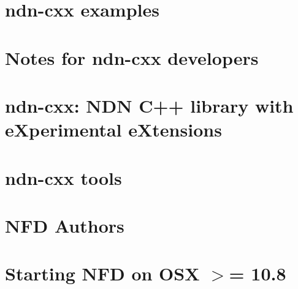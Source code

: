 \documentclass[twoside]{book}
\newcommand{\+}{\discretionary{\mbox{\scriptsize$\hookleftarrow$}}{}{}}
\begin{document}
\chapter{ndn-\/cxx examples}
\label{md__home_network_NSOL_ndnSIM-dev_ns-3_src_ndnSIM_ndn-cxx_examples_README}
\hypertarget{md__home_network_NSOL_ndnSIM-dev_ns-3_src_ndnSIM_ndn-cxx_examples_README}{}

\chapter{Notes for ndn-\/cxx developers}
\label{md__home_network_NSOL_ndnSIM-dev_ns-3_src_ndnSIM_ndn-cxx_README-dev}
\hypertarget{md__home_network_NSOL_ndnSIM-dev_ns-3_src_ndnSIM_ndn-cxx_README-dev}{}

\chapter{ndn-\/cxx\+: N\+DN C++ library with e\+Xperimental e\+Xtensions}
\label{md__home_network_NSOL_ndnSIM-dev_ns-3_src_ndnSIM_ndn-cxx_README}
\hypertarget{md__home_network_NSOL_ndnSIM-dev_ns-3_src_ndnSIM_ndn-cxx_README}{}

\chapter{ndn-\/cxx tools}
\label{md__home_network_NSOL_ndnSIM-dev_ns-3_src_ndnSIM_ndn-cxx_tools_README}
\hypertarget{md__home_network_NSOL_ndnSIM-dev_ns-3_src_ndnSIM_ndn-cxx_tools_README}{}

\chapter{N\+FD Authors}
\label{md__home_network_NSOL_ndnSIM-dev_ns-3_src_ndnSIM_NFD_AUTHORS}
\hypertarget{md__home_network_NSOL_ndnSIM-dev_ns-3_src_ndnSIM_NFD_AUTHORS}{}

\chapter{Starting N\+FD on O\+SX $>$= 10.8}
\label{md__home_network_NSOL_ndnSIM-dev_ns-3_src_ndnSIM_NFD_contrib_osx-launchd_README}
\hypertarget{md__home_network_NSOL_ndnSIM-dev_ns-3_src_ndnSIM_NFD_contrib_osx-launchd_README}{}

\end{document}
